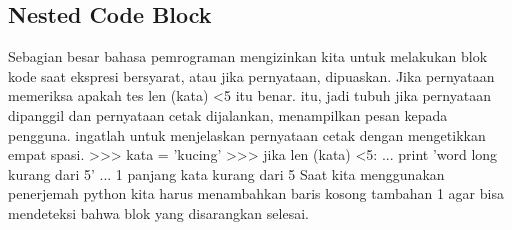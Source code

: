 \subsection {Nested Code Block}
Sebagian besar bahasa pemrograman mengizinkan kita untuk melakukan blok kode saat ekspresi bersyarat, atau jika pernyataan, dipuaskan.
Jika pernyataan memeriksa apakah tes len (kata) <5 itu benar. itu, jadi tubuh jika pernyataan dipanggil dan pernyataan cetak dijalankan, menampilkan pesan kepada pengguna. ingatlah untuk menjelaskan pernyataan cetak dengan mengetikkan empat spasi.
>>> kata = 'kucing'
>>> jika len (kata) <5:
... print 'word long kurang dari 5'
... 1
panjang kata kurang dari 5
Saat kita menggunakan penerjemah python kita harus menambahkan baris kosong tambahan 1 agar bisa mendeteksi bahwa blok yang disarangkan selesai.
